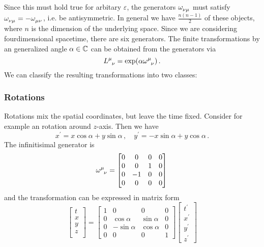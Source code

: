 Since this must hold true for arbitary $\varepsilon$, the generators
$\tensor{\omega}{_\nu_\mu}$ must satisfy
$\tensor{\omega}{_\nu_\mu}=-\tensor{\omega}{_\mu_\nu}$, i.e. be antisymmetric.
In general we have $\frac{n(n-1)}{2}$ of these objects, where $n$ is the
dimension of the underlying space.
Since we are considering fourdimensional spacetime, there are six generators.
The finite transformations by an generalized angle $\alpha\in\mathbb{C}$ can be
obtained from the generators via
\begin{equation}
    \tensor{L}{^\mu_\nu}=\exp\left(\alpha\tensor{\omega}{^\mu_\nu}\right)\,.
\end{equation}
We can
classify the resulting transformations into two classes:
\subsubsection{Rotations}
Rotations mix the spatial coordinates, but leave the time fixed. Consider for
example an rotation around $z$-axis. Then we have
\begin{equation}
    x^\prime=x\cos\alpha+y\sin\alpha \, ,\quad y^\prime=-x\sin\alpha+y\cos\alpha \, .
\end{equation}
The infinitisimal generator is
\begin{equation}
    \tensor{\omega}{^\mu_\nu}
    =
    \begin{bmatrix}
        0&0 & 0&0\\
        0&0 &1&0\\
        0&-1&0 &0\\
        0&0 &0 &0
    \end{bmatrix}\,
\end{equation}
and the transformation can be expressed in matrix form
\begin{equation}
    \begin{bmatrix}
        t\\
        x\\
        y\\
        z\\
    \end{bmatrix}=
    \begin{bmatrix}
        1&0 & 0&0\\
        0&\cos\alpha &\sin\alpha&0\\
        0&-\sin\alpha&\cos\alpha &0\\
        0&0 &0 &1
    \end{bmatrix}
    \begin{bmatrix}
        t^\prime\\
        x^\prime\\
        y^\prime\\
        z^\prime
    \end{bmatrix}
\end{equation}
